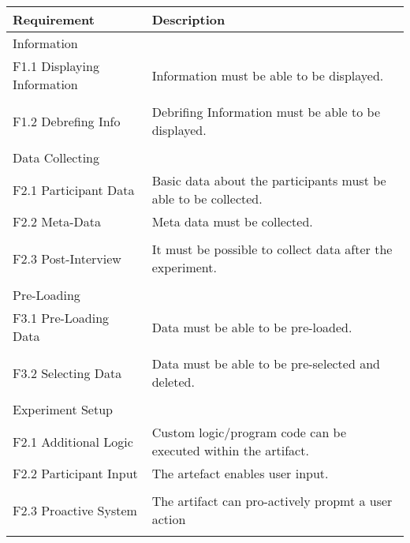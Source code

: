 \begin{table}[htbp]
    \centering
    \small
    \begin{tabular}{L{0.35\textwidth}L{0.59\textwidth}}
    \hline
    Requirement                     & Description \\ \hline
    Information                 &             \\ \hline
    F1.1 Displaying Information     & Information must be able to be displayed.            \\
     & \\
    F1.2 Debrefing Info             & Debrifing Information must be able to be displayed.           \\
    & \\ \hline
    Data Collecting             &             \\ \hline
    F2.1 Participant Data           & Basic data about the participants must be able to be collected.           \\
    F2.2 Meta-Data                  & Meta data must be collected.            \\
    & \\
    F2.3 Post-Interview             & It must be possible to collect data after the experiment.            \\
    & \\  \hline
    Pre-Loading                 &             \\ \hline
    F3.1 Pre-Loading Data           & Data must be able to be pre-loaded.            \\
    & \\
    F3.2 Selecting Data             & Data must be able to be pre-selected and deleted.           \\
    & \\ \hline
    Experiment Setup            &             \\ \hline
    F2.1 Additional Logic           & Custom logic/program code can be executed within the artifact.            \\
    F2.2 Participant Input          & The artefact enables user input.            \\
    & \\
    F2.3 Proactive System           & The artifact can pro-actively propmt a user action           \\
    & \\ \hline

\end{tabular}
\end{table}
